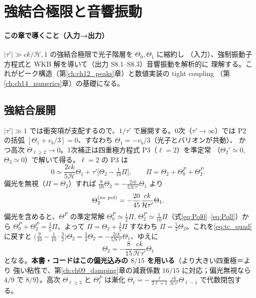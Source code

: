 \section{強結合極限と音響振動}
\label{ch:ch08_acoustic}

\paragraph{この章で導くこと（入力→出力）}
$|\tau'|\gg ck/\mathcal H,1$ の強結合極限で光子階層を $\Theta_0,\Theta_1$ に縮約し
（入力）、強制振動子方程式と WKB 解を導いて（出力 S8.1--S8.3）音響振動を解析的に
理解する。これがピーク構造（第\ref{ch:ch12_peaks}章）と数値実装の tight coupling
（第\ref{ch:ch14_numerics}章）の基礎になる。

\subsection{強結合展開}
$|\tau'|\gg1$ では衝突項が支配するので、$1/\tau'$ で展開する。0次（$\tau'\to\infty$）では
P2 の括弧 $[\Theta_1+v_b/3]=0$、すなわち $\Theta_1=-v_b/3$（光子とバリオンが共動）、
かつ高次 $\Theta_{\ell\ge2}\to0$。1次補正は四重極方程式 P3（$\ell=2$）を準定常
（$\Theta_2'\simeq0$, $\Theta_3\simeq0$）で解いて得る。$\ell=2$ の P3 は
\begin{equation}
  0\simeq\frac{2ck}{5\mathcal H}\Theta_1+\tau'\Big[\Theta_2-\tfrac{1}{10}\Pi\Big],
  \qquad \Pi=\Theta_2+\Theta^P_0+\Theta^P_2.
  \label{eq:tc_quad}
\end{equation}
偏光を無視（$\Pi=\Theta_2$）すれば $\tfrac{9}{10}\Theta_2=-\tfrac{2ck}{5\mathcal H\tau'}\Theta_1$
より
\begin{equation}
  \Theta_2^{\rm (no\ pol)}=-\frac{20}{45}\frac{ck}{\mathcal H\tau'}\Theta_1.
\end{equation}
偏光を含めると、$\Theta^P$ の準定常解 $\Theta^P_0\simeq\tfrac12\Pi$,
$\Theta^P_2\simeq\tfrac1{10}\Pi$（式\eqref{eq:Pol0}--\eqref{eq:Poll}）から
$\Theta^P_0+\Theta^P_2=\tfrac35\Pi$、よって $\Pi=\Theta_2+\tfrac35\Pi$ すなわち
$\Pi=\tfrac52\Theta_2$。これを\eqref{eq:tc_quad} に戻すと
$\big(\tfrac{9}{10}-\tfrac{1}{10}\cdot\tfrac32\big)\Theta_2=\tfrac34\Theta_2
=-\tfrac{2ck}{5\mathcal H\tau'}\Theta_1$、ゆえに
\begin{equation}
  \boxed{\ \Theta_2=-\frac{8}{15}\frac{ck}{\mathcal H\tau'}\Theta_1\ }
  \label{eq:tc8_15}
\end{equation}
となる。\textbf{本書・コードはこの偏光込みの $8/15$ を用いる}（より大きい四重極＝より
強い粘性で、第\ref{ch:ch09_damping}章の減衰係数 $16/15$ に対応；偏光無視なら $4/9$ で
$8/9$）。高次 $\Theta_{\ell\ge3}$ と $\Theta^P_\ell$ は漸化
$\Theta_\ell=-\tfrac{\ell}{2\ell+1}\tfrac{ck}{\mathcal H\tau'}\Theta_{\ell-1}$ で代数閉包する。

